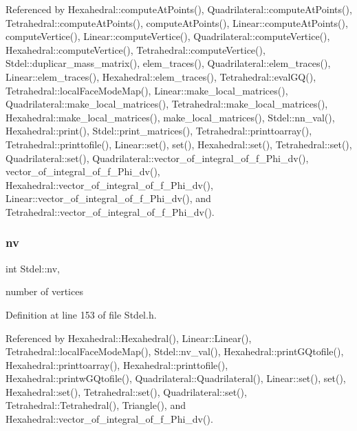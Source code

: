 Referenced by Hexahedral\+::compute\+At\+Points(), Quadrilateral\+::compute\+At\+Points(), Tetrahedral\+::compute\+At\+Points(), compute\+At\+Points(), Linear\+::compute\+At\+Points(), compute\+Vertice(), Linear\+::compute\+Vertice(), Quadrilateral\+::compute\+Vertice(), Hexahedral\+::compute\+Vertice(), Tetrahedral\+::compute\+Vertice(), Stdel\+::duplicar\+\_\+mass\+\_\+matrix(), elem\+\_\+traces(), Quadrilateral\+::elem\+\_\+traces(), Linear\+::elem\+\_\+traces(), Hexahedral\+::elem\+\_\+traces(), Tetrahedral\+::eval\+G\+Q(), Tetrahedral\+::local\+Face\+Mode\+Map(), Linear\+::make\+\_\+local\+\_\+matrices(), Quadrilateral\+::make\+\_\+local\+\_\+matrices(), Tetrahedral\+::make\+\_\+local\+\_\+matrices(), Hexahedral\+::make\+\_\+local\+\_\+matrices(), make\+\_\+local\+\_\+matrices(), Stdel\+::nn\+\_\+val(), Hexahedral\+::print(), Stdel\+::print\+\_\+matrices(), Tetrahedral\+::printtoarray(), Tetrahedral\+::printtofile(), Linear\+::set(), set(), Hexahedral\+::set(), Tetrahedral\+::set(), Quadrilateral\+::set(), Quadrilateral\+::vector\+\_\+of\+\_\+integral\+\_\+of\+\_\+f\+\_\+\+Phi\+\_\+dv(), vector\+\_\+of\+\_\+integral\+\_\+of\+\_\+f\+\_\+\+Phi\+\_\+dv(), Hexahedral\+::vector\+\_\+of\+\_\+integral\+\_\+of\+\_\+f\+\_\+\+Phi\+\_\+dv(), Linear\+::vector\+\_\+of\+\_\+integral\+\_\+of\+\_\+f\+\_\+\+Phi\+\_\+dv(), and Tetrahedral\+::vector\+\_\+of\+\_\+integral\+\_\+of\+\_\+f\+\_\+\+Phi\+\_\+dv().

\mbox{\label{classStdel_a20c0e35541cab4a1f07974659ae7a9ad}} 
\subsubsection{\texorpdfstring{nv}{nv}}
{\footnotesize\ttfamily int Stdel\+::nv\hspace{0.3cm}{\ttfamily [protected]}, {\ttfamily [inherited]}}



number of vertices 



Definition at line 153 of file Stdel.\+h.



Referenced by Hexahedral\+::\+Hexahedral(), Linear\+::\+Linear(), Tetrahedral\+::local\+Face\+Mode\+Map(), Stdel\+::nv\+\_\+val(), Hexahedral\+::print\+G\+Qtofile(), Hexahedral\+::printtoarray(), Hexahedral\+::printtofile(), Hexahedral\+::printw\+G\+Qtofile(), Quadrilateral\+::\+Quadrilateral(), Linear\+::set(), set(), Hexahedral\+::set(), Tetrahedral\+::set(), Quadrilateral\+::set(), Tetrahedral\+::\+Tetrahedral(), Triangle(), and Hexahedral\+::vector\+\_\+of\+\_\+integral\+\_\+of\+\_\+f\+\_\+\+Phi\+\_\+dv().

